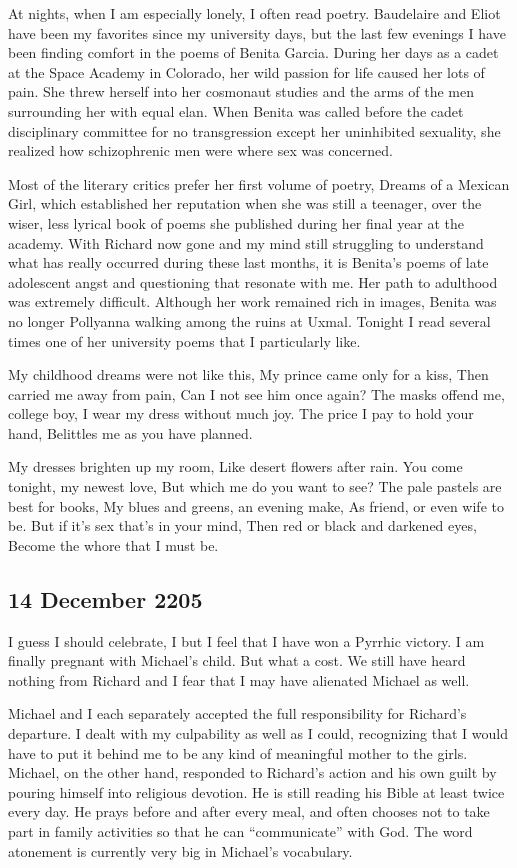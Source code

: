 \documentclass[]{article}
\begin{document}
At nights, when I am especially lonely, I often read poetry.  Baudelaire and Eliot have been my favorites since my university days, but the last few evenings I have been finding comfort in the poems of Benita Garcia.  During her days as a cadet at the Space Academy in Colorado, her wild passion for life caused her lots of pain.  She threw herself into her cosmonaut studies and the arms of the men surrounding her with equal elan.  When Benita was called before the cadet disciplinary committee for no transgression except her uninhibited sexuality, she realized how schizophrenic men were where sex was concerned.

Most of the literary critics prefer her first volume of poetry, Dreams of a Mexican Girl, which established her reputation when she was still a teenager, over the wiser, less lyrical book of poems she published during her final year at the academy.  With Richard now gone and my mind still struggling to understand what has really occurred during these last months, it is Benita’s poems of late adolescent angst and questioning that resonate with me.  Her path to adulthood was extremely difficult.  Although her work remained rich in images, Benita was no longer Pollyanna walking among the ruins at Uxmal.  Tonight I read several times one of her university poems that I particularly like.

My childhood dreams were not like this, My prince came only for a kiss, Then carried me away from pain, Can I not see him once again? The masks offend me, college boy, I wear my dress without much joy.  The price I pay to hold your hand, Belittles me as you have planned.

My dresses brighten up my room, Like desert flowers after rain.  You come tonight, my newest love, But which me do you want to see? The pale pastels are best for books, My blues and greens, an evening make, As friend, or even wife to be.  But if it’s sex that’s in your mind, Then red or black and darkened eyes, Become the whore that I must be.

\subsection*{14 December 2205}

I guess I should celebrate, I but I feel that I have won a Pyrrhic victory.  I am finally pregnant with Michael’s child.  But what a cost.  We still have heard nothing from Richard and I fear that I may have alienated Michael as well.

Michael and I each separately accepted the full responsibility for Richard’s departure.  I dealt with my culpability as well as I could, recognizing that I would have to put it behind me to be any kind of meaningful mother to the girls.  Michael, on the other hand, responded to Richard’s action and his own guilt by pouring himself into religious devotion.  He is still reading his Bible at least twice every day.  He prays before and after every meal, and often chooses not to take part in family activities so that he can “communicate” with God.  The word atonement is currently very big in Michael’s vocabulary.
\end{document}
